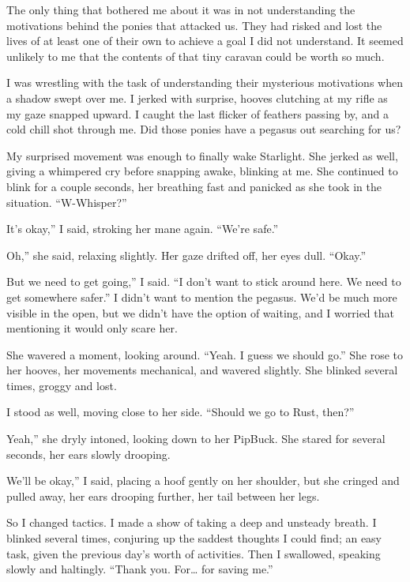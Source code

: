 The only thing that bothered me about it was in not understanding the motivations behind the ponies that attacked us. They had risked and lost the lives of at least one of their own to achieve a goal I did not understand. It seemed unlikely to me that the contents of that tiny caravan could be worth so much.

I was wrestling with the task of understanding their mysterious motivations when a shadow swept over me. I jerked with surprise, hooves clutching at my rifle as my gaze snapped upward. I caught the last flicker of feathers passing by, and a cold chill shot through me. Did those ponies have a pegasus out searching for us?

My surprised movement was enough to finally wake Starlight. She jerked as well, giving a whimpered cry before snapping awake, blinking at me. She continued to blink for a couple seconds, her breathing fast and panicked as she took in the situation. “W-Whisper?”

\leavevmode{}It’s okay,” I said, stroking her mane again. “We’re safe.”

\leavevmode{}Oh,” she said, relaxing slightly. Her gaze drifted off, her eyes dull. “Okay.”

\leavevmode{}But we need to get going,” I said. “I don’t want to stick around here. We need to get somewhere safer.” I didn’t want to mention the pegasus. We’d be much more visible in the open, but we didn’t have the option of waiting, and I worried that mentioning it would only scare her.

She wavered a moment, looking around. “Yeah. I guess we should go.” She rose to her hooves, her movements mechanical, and wavered slightly. She blinked several times, groggy and lost.

I stood as well, moving close to her side. “Should we go to Rust, then?”

\leavevmode{}Yeah,” she dryly intoned, looking down to her PipBuck. She stared for several seconds, her ears slowly drooping.

\leavevmode{}We’ll be okay,” I said, placing a hoof gently on her shoulder, but she cringed and pulled away, her ears drooping further, her tail between her legs.

So I changed tactics. I made a show of taking a deep and unsteady breath. I blinked several times, conjuring up the saddest thoughts I could find; an easy task, given the previous day’s worth of activities. Then I swallowed, speaking slowly and haltingly. “Thank you. For… for saving me.”

